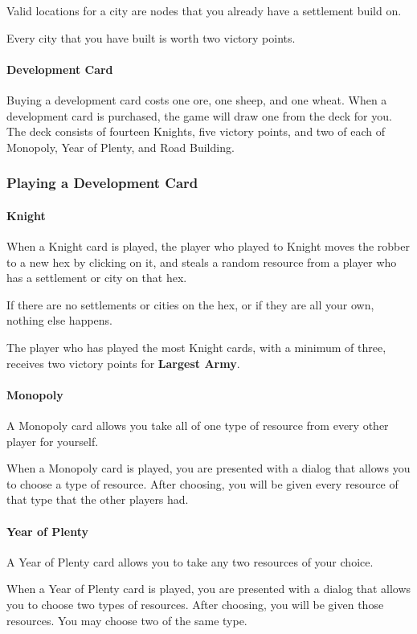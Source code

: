 \documentclass[12pt,letterpaper,titlepage]{article}
\begin{document}
			Valid locations for a city are nodes that you already have a settlement build on.
			
			Every city that you have built is worth two victory points.
			
			\paragraph{Development Card}
			Buying a development card costs one ore, one sheep, and one wheat. When a development card is purchased, the game will draw one from the deck for you. The deck consists of fourteen Knights, five victory points, and two of each of Monopoly, Year of Plenty, and Road Building.

		\subsubsection{Playing a Development Card}
			\paragraph{Knight}
			When a Knight card is played, the player who played to Knight moves the robber to a new hex by clicking on it, and steals a random resource from a player who has a settlement or city on that hex.
			
			If there are no settlements or cities on the hex, or if they are all your own, nothing else happens.
			
			The player who has played the most Knight cards, with a minimum of three, receives two victory points for \textbf{Largest Army}.
			
			\paragraph{Monopoly}
			A Monopoly card allows you take all of one type of resource from every other player for yourself.
			
			When a Monopoly card is played, you are presented with a dialog that allows you to choose a type of resource. After choosing, you will be given every resource of that type that the other players had.
			
			\paragraph{Year of Plenty}
			A Year of Plenty card allows you to take any two resources of your choice.
			
			When a Year of Plenty card is played, you are presented with a dialog that allows you to choose two types of resources. After choosing, you will be given those resources. You may choose two of the same type.
			
\end{document}
